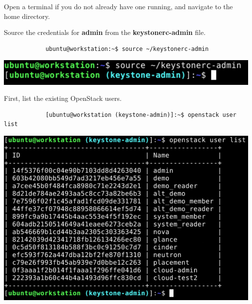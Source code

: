 \documentclass[letterpaper, 12pt]{article}
\begin{document}
\begin{enumerate}
    \begin{labstep}
        Open a terminal if you do not already have one running, and navigate to the home directory.
    \end{labstep}

    \begin{labstep}
        Source the credentials for \textbf{admin} from the \textbf{keystonerc-admin} file.
        \begin{lstlisting}
            ubuntu@workstation:~$ source ~/keystonerc-admin
        \end{lstlisting}

        \begin{center}
            \includegraphics[width=\linewidth]{images/part4/step2.png}
        \end{center}
    \end{labstep}

    \begin{labstep}
        First, list the existing OpenStack users.
        \begin{lstlisting}
            [ubuntu@workstation (keystone-admin)]:~$ openstack user list
        \end{lstlisting}

        \begin{center}
            \includegraphics[width=\linewidth]{images/part4/step3.png}
        \end{center}
    \end{labstep}


\end{enumerate}
\end{document}
